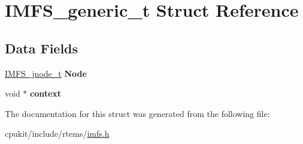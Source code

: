 \hypertarget{structIMFS__generic__t}{}\section{I\+M\+F\+S\+\_\+generic\+\_\+t Struct Reference}
\label{structIMFS__generic__t}
\subsection*{Data Fields}
\begin{DoxyCompactItemize}
\item 
\mbox{\label{structIMFS__generic__t_a7d64c7a2dcfe15e246ea5897d4fc42f5}} 
\mbox{\hyperlink{structIMFS__jnode__tt}{I\+M\+F\+S\+\_\+jnode\+\_\+t}} {\bfseries Node}
\item 
\mbox{\label{structIMFS__generic__t_a10c963751a2fbbcbea73420e7106971b}} 
void $\ast$ {\bfseries context}
\end{DoxyCompactItemize}


The documentation for this struct was generated from the following file\+:\begin{DoxyCompactItemize}
\item 
cpukit/include/rtems/\mbox{\hyperlink{imfs_8h}{imfs.\+h}}\end{DoxyCompactItemize}
